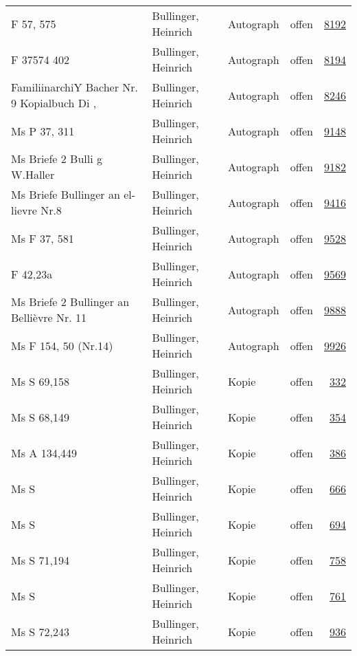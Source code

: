\documentclass[10pt,a4paper,landscape]{report}
\begin{document}
\begin{longtable}{p{16cm}p{4cm}llr}
F 57, 575	&	Bullinger, Heinrich	&	Autograph	&	offen	&	\href{http://130.60.24.72/assignment/8192}{8192}\\
F 37574 402	&	Bullinger, Heinrich	&	Autograph	&	offen	&	\href{http://130.60.24.72/assignment/8194}{8194}\\
FamiliinarchiY Bacher Nr. 9 Kopialbuch Di ,	&	Bullinger, Heinrich	&	Autograph	&	offen	&	\href{http://130.60.24.72/assignment/8246}{8246}\\
Ms P 37, 311	&	Bullinger, Heinrich	&	Autograph	&	offen	&	\href{http://130.60.24.72/assignment/9148}{9148}\\
Ms Briefe 2 Bulli g W.Haller	&	Bullinger, Heinrich	&	Autograph	&	offen	&	\href{http://130.60.24.72/assignment/9182}{9182}\\
Ms Briefe Bullinger an el- lievre Nr.8	&	Bullinger, Heinrich	&	Autograph	&	offen	&	\href{http://130.60.24.72/assignment/9416}{9416}\\
Ms F 37, 581	&	Bullinger, Heinrich	&	Autograph	&	offen	&	\href{http://130.60.24.72/assignment/9528}{9528}\\
F 42,23a	&	Bullinger, Heinrich	&	Autograph	&	offen	&	\href{http://130.60.24.72/assignment/9569}{9569}\\
Ms Briefe 2 Bullinger an Bellièvre Nr. 11	&	Bullinger, Heinrich	&	Autograph	&	offen	&	\href{http://130.60.24.72/assignment/9888}{9888}\\
Ms F 154, 50 (Nr.14)	&	Bullinger, Heinrich	&	Autograph	&	offen	&	\href{http://130.60.24.72/assignment/9926}{9926}\\
Ms S 69,158	&	Bullinger, Heinrich	&	Kopie	&	offen	&	\href{http://130.60.24.72/assignment/332}{332}\\
Ms S 68,149	&	Bullinger, Heinrich	&	Kopie	&	offen	&	\href{http://130.60.24.72/assignment/354}{354}\\
Ms A 134,449	&	Bullinger, Heinrich	&	Kopie	&	offen	&	\href{http://130.60.24.72/assignment/386}{386}\\
Ms S	&	Bullinger, Heinrich	&	Kopie	&	offen	&	\href{http://130.60.24.72/assignment/666}{666}\\
Ms S	&	Bullinger, Heinrich	&	Kopie	&	offen	&	\href{http://130.60.24.72/assignment/694}{694}\\
Ms S 71,194	&	Bullinger, Heinrich	&	Kopie	&	offen	&	\href{http://130.60.24.72/assignment/758}{758}\\
Ms S	&	Bullinger, Heinrich	&	Kopie	&	offen	&	\href{http://130.60.24.72/assignment/761}{761}\\
Ms S 72,243	&	Bullinger, Heinrich	&	Kopie	&	offen	&	\href{http://130.60.24.72/assignment/936}{936}\\

\end{longtable}
\end{document}

